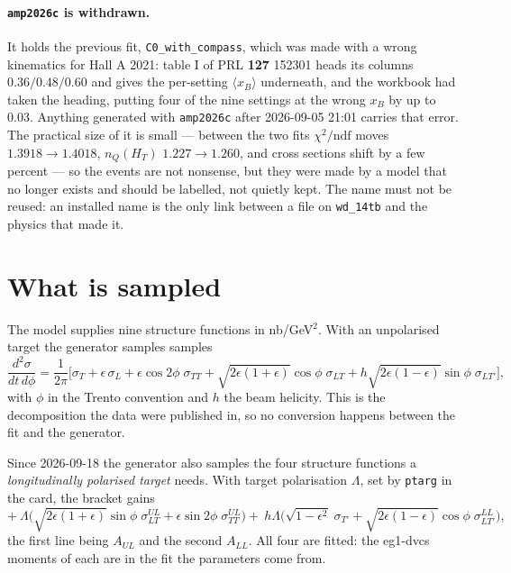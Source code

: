 \documentclass[11pt,a4paper]{article}
\newcommand{\sig}[1]{\sigma_{#1}}
\newcommand{\code}[1]{\texttt{#1}}
\begin{document}
\paragraph{\code{amp2026c} is withdrawn.}  It holds the previous fit,
\code{C0\_with\_compass}, which was made with a wrong kinematics for Hall A
2021: table I of PRL \textbf{127} 152301 heads its columns $0.36/0.48/0.60$ and
gives the per-setting $\langle x_B\rangle$ underneath, and the workbook had
taken the heading, putting four of the nine settings at the wrong $x_B$ by up to
$0.03$.  Anything generated with \code{amp2026c} after 2026-09-05 21:01 carries
that error.  The practical size of it is small --- between the two fits
$\chi^2/\mathrm{ndf}$ moves $1.3918 \to 1.4018$, $n_Q(H_T)$ $1.227 \to 1.260$,
and cross sections shift by a few percent --- so the events are not nonsense,
but they were made by a model that no longer exists and should be labelled, not
quietly kept.  The name must not be reused: an installed name is the only link
between a file on \code{wd\_14tb} and the physics that made it.

\section{What is sampled}

The model supplies nine structure functions in nb/GeV$^2$.  With an unpolarised target the generator samples
samples
\begin{equation}
\frac{d^2\sigma}{dt\,d\phi} = \frac{1}{2\pi}\Big[
\sig{T} + \epsilon\,\sig{L}
+ \epsilon\cos 2\phi\; \sig{TT}
+ \sqrt{2\epsilon(1+\epsilon)}\cos\phi\; \sig{LT}
+ h\sqrt{2\epsilon(1-\epsilon)}\sin\phi\; \sig{LT'}\Big],
\label{eq:phi}
\end{equation}
with $\phi$ in the Trento convention and $h$ the beam helicity.  This is the
decomposition the data were published in, so no conversion happens between the
fit and the generator.

Since 2026-09-18 the generator also samples the four structure functions a
\emph{longitudinally polarised target} needs.  With target polarisation
$\Lambda$, set by \code{ptarg} in the card, the bracket gains
\begin{equation}
+\ \Lambda\Big(\sqrt{2\epsilon(1+\epsilon)}\sin\phi\; \sig{LT}^{UL}
             + \epsilon\sin 2\phi\; \sig{TT}^{UL}\Big)
+\ h\Lambda\Big(\sqrt{1-\epsilon^2}\; \sig{T'}
              + \sqrt{2\epsilon(1-\epsilon)}\cos\phi\; \sig{LT'}^{LL}\Big),
\end{equation}
the first line being $A_{UL}$ and the second $A_{LL}$.  All four are fitted:
the eg1-dvcs moments of each are in the fit the parameters come from.
\end{document}

